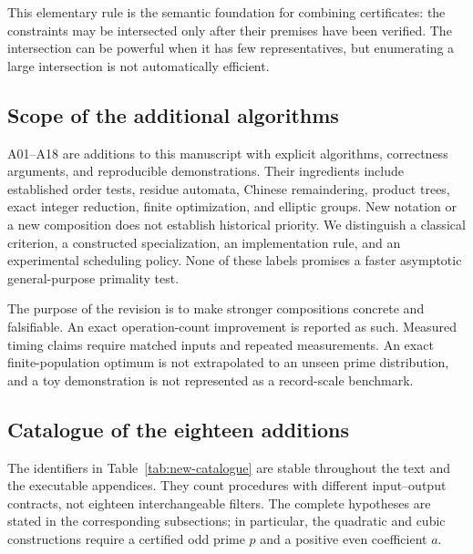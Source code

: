 \documentclass[11pt,a4paper]{article}
\theoremstyle{definition}\newtheorem{definition}[theorem]{Definition}
\theoremstyle{remark}\newtheorem{remark}[theorem]{Remark}
\begin{document}
This elementary rule is the semantic foundation for combining certificates:
the constraints may be intersected only after their premises have been
verified. The intersection can be powerful when it has few representatives,
but enumerating a large intersection is not automatically efficient.

\subsection{Scope of the additional algorithms}

A01--A18 are additions to this manuscript with explicit algorithms,
correctness arguments, and reproducible demonstrations. Their ingredients
include established order tests, residue automata, Chinese remaindering,
product trees, exact integer reduction, finite optimization, and elliptic
groups. New notation or a new composition does not establish historical
priority. We distinguish a classical criterion, a constructed specialization,
an implementation rule, and an experimental scheduling policy. None of
these labels promises a faster asymptotic general-purpose primality test.

The purpose of the revision is to make stronger compositions concrete and
falsifiable. An exact operation-count improvement is reported as such.
Measured timing claims require matched inputs and repeated measurements.
An exact finite-population optimum is not extrapolated to an unseen prime
distribution, and a toy demonstration is not represented as a record-scale
benchmark.


\subsection{Catalogue of the eighteen additions}
\label{sec:new-catalogue}

The identifiers in Table~\ref{tab:new-catalogue} are stable throughout the
text and the executable appendices. They count procedures with different
input--output contracts, not eighteen interchangeable filters. The complete
hypotheses are stated in the corresponding subsections; in particular,
the quadratic and cubic constructions require a certified odd prime $p$
and a positive even coefficient $a$.
\end{document}
